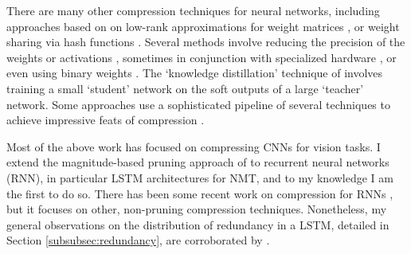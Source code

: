 \begin{sloppypar}
There are many other compression techniques for neural networks, including approaches based on on low-rank approximations for weight matrices \cite{jaderberg2014speeding,denton2014exploiting}, or weight sharing  via hash functions \cite{chen2015compressing}.
Several methods involve reducing the precision of the weights or activations \cite{courbariaux2014low}, sometimes in conjunction with specialized hardware \cite{gupta2015deep}, or even using binary weights \cite{lin2015neural}.
The `knowledge distillation' technique of \cite{hinton2015distilling} involves training a small `student' network on the soft outputs of a large `teacher' network.
Some approaches use a sophisticated pipeline of several techniques to achieve impressive feats of compression \cite{han2015deep,iandola2016squeezenet}.
\end{sloppypar}

Most of the above work has focused on compressing CNNs for vision tasks. 
I extend the magnitude-based pruning approach of \cite{han2015learning} to recurrent neural networks (RNN), in particular LSTM architectures for NMT, and to my knowledge I am the first to do so.
There has been some recent work on compression for RNNs \cite{lu2016learning,prabhavalkar2016compression}, but it focuses on other, non-pruning compression techniques. 
Nonetheless, my general observations on the distribution of redundancy in a
LSTM, detailed in Section \ref{subsubsec:redundancy}, are corroborated by \cite{lu2016learning}.
